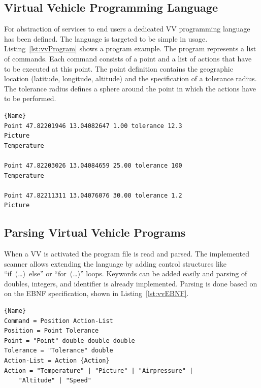 \subsection{Virtual Vehicle Programming Language}

For abstraction of services to end users a dedicated \ac{VV} programming language has been defined. The language
is targeted to be simple in usage. Listing~\ref{lst:vvProgram} shows a program example. The program represents a
list of commands. Each command consists of a point and a list of actions that have to be executed at this point. The
point definition contains the geographic location (latitude, longitude, altitude) and the specification of a tolerance
radius. The tolerance radius defines a sphere around the point in which the actions have to be performed.

\lstset{tabsize=3,language=Tex}
\begin{lstlisting}[caption={Virtual Vehicle Sample Program},mathescape=true,label=lst:vvProgram]{Name}
Point 47.82201946 13.04082647 1.00 tolerance 12.3
Picture
Temperature

Point 47.82203026 13.04084659 25.00 tolerance 100
Temperature

Point 47.82211311 13.04076076 30.00 tolerance 1.2
Picture
\end{lstlisting}

\subsection{Parsing Virtual Vehicle Programs}
When a \ac{VV} is activated the program file is read and parsed. The implemented scanner allows extending the 
language by adding control structures like ``if~(\ldots)~else'' or ``for~(\ldots)'' loops. Keywords can be added easily and
parsing of doubles, integers, and identifier is already implemented. 
%
Parsing is done based on on the EBNF specification, shown in Listing~\ref{lst:vvEBNF}.

\lstset{tabsize=3,language=Tex}
\begin{lstlisting}[caption={Virtual Vehicle EBNF},mathescape=true,label=lst:vvEBNF]{Name}
Command = Position Action-List
Position = Point Tolerance
Point = "Point" double double double
Tolerance = "Tolerance" double
Action-List = Action {Action}
Action = "Temperature" | "Picture" | "Airpressure" |
	"Altitude" | "Speed"
\end{lstlisting}



